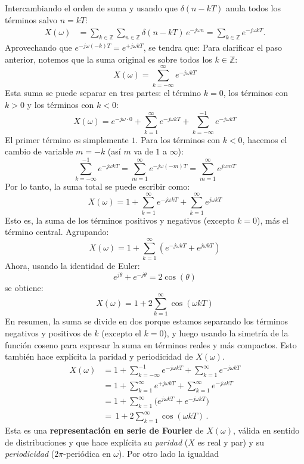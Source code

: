 \documentclass[
  11pt,
  letterpaper,
   addpoints,
   answers
  ]{exam}
\begin{document}
\begin{questions}
\begin{solution}
Intercambiando el orden de suma y usando que $\delta(n-kT)$ anula todos los términos salvo $n=kT$:
\begin{align*}
X(\omega)
&=\sum_{k\in\mathbb{Z}}\sum_{n\in\mathbb{Z}} \delta(n-kT)\,e^{-j\omega n}
=\sum_{k\in\mathbb{Z}} e^{-j\omega kT}.
\end{align*}
Aprovechando que $e^{-j\omega(-k)T}=e^{+j\omega kT}$, se tendra que:
Para clarificar el paso anterior, notemos que la suma original es sobre todos los $k\in\mathbb{Z}$:
\[
X(\omega) = \sum_{k=-\infty}^{\infty} e^{-j\omega kT}
\]
Esta suma se puede separar en tres partes: el término $k=0$, los términos con $k>0$ y los términos con $k<0$:
\[
X(\omega) = e^{-j\omega\cdot 0} + \sum_{k=1}^{\infty} e^{-j\omega kT} + \sum_{k=-\infty}^{-1} e^{-j\omega kT}
\]
El primer término es simplemente $1$. Para los términos con $k<0$, hacemos el cambio de variable $m=-k$ (así $m$ va de $1$ a $\infty$):
\[
\sum_{k=-\infty}^{-1} e^{-j\omega kT} = \sum_{m=1}^{\infty} e^{-j\omega (-m)T} = \sum_{m=1}^{\infty} e^{j\omega mT}
\]
Por lo tanto, la suma total se puede escribir como:
\[
X(\omega) = 1 + \sum_{k=1}^{\infty} e^{-j\omega kT} + \sum_{k=1}^{\infty} e^{j\omega kT}
\]
Esto es, la suma de los términos positivos y negativos (excepto $k=0$), más el término central. Agrupando:
\[
X(\omega) = 1 + \sum_{k=1}^{\infty} \left( e^{-j\omega kT} + e^{j\omega kT} \right)
\]
Ahora, usando la identidad de Euler:
\[
e^{j\theta} + e^{-j\theta} = 2\cos(\theta)
\]
se obtiene:
\[
X(\omega) = 1 + 2 \sum_{k=1}^{\infty} \cos(\omega kT)
\]
En resumen, la suma se divide en dos porque estamos separando los términos negativos y positivos de $k$ (excepto el $k=0$), y luego usando la simetría de la función coseno para expresar la suma en términos reales y más compactos. Esto también hace explícita la paridad y periodicidad de $X(\omega)$.
\begin{align*}
X(\omega)
&=1+\sum_{k=-\infty}^{-1}e^{-j\omega kT}+\sum_{k=1}^{\infty}e^{-j\omega kT}\\
&=1+\sum_{k=1}^{\infty}e^{+j\omega kT}+\sum_{k=1}^{\infty}e^{-j\omega kT}\\
&=1+\sum_{k=1}^{\infty}\big(e^{j\omega kT}+e^{-j\omega kT}\big)\\
&=\boxed{\,1+2\sum_{k=1}^{\infty}\cos(\omega kT)\,}.
\end{align*}
Esta es una \textbf{representación en serie de Fourier} de $X(\omega)$, válida en sentido de distribuciones y que hace explícita su \emph{paridad} ($X$ es real y par) y su \emph{periodicidad} ($2\pi$-periódica en $\omega$). Por otro lado la igualdad

\end{solution}
\end{questions}
\end{document}
